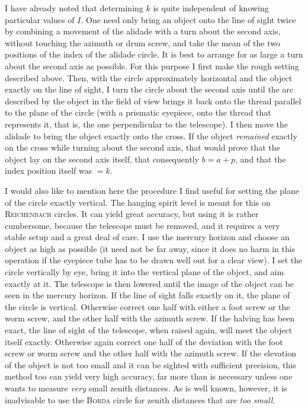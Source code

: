 \par\indent I have already noted that determining $k$ is quite independent of knowing particular values of $I$. One need only bring an object onto the line of sight twice by combining a movement of the alidade with a turn about the second axis, without touching the azimuth or drum screw, and take the mean of the two positions of the index of the alidade circle. It is best to arrange for as large a turn about the second axis as possible. For this purpose I first make the rough setting described above. Then, with the circle approximately horizontal and the object exactly on the line of sight, I turn the circle about the second axis until the arc described by the object in the field of view brings it back onto the thread parallel to the plane of the circle (with a prismatic eyepiece, onto the thread that represents it, that is, the one perpendicular to the telescope). I then move the alidade to bring the object exactly onto the cross. If the object \emph{remained} exactly on the cross while turning about the second axis, that would prove that the object lay on the second axis itself, that consequently $b=a+p$, and that the index position itself was $=k$.

\par\indent I would also like to mention here the procedure I find useful for setting the plane of the circle exactly vertical. The hanging spirit level is meant for this on \textsc{Reichenbach} circles. It can yield great accuracy, but using it is rather cumbersome, because the telescope must be removed, and it requires a very stable setup and a great deal of care. I use the mercury horizon and choose an object as high as possible (it need not be far away, since it does no harm in this operation if the eyepiece tube has to be drawn well out for a clear view). I set the circle vertically by eye, bring it into the vertical plane of the object, and aim exactly at it. The telescope is then lowered until the image of the object can be seen in the mercury horizon. If the line of sight falls exactly on it, the plane of the circle is vertical. Otherwise correct one half with either a foot screw or the worm screw, and the other half with the azimuth screw. If the halving has been exact, the line of sight of the telescope, when raised again, will meet the object itself exactly. Otherwise again correct one half of the deviation with the foot screw or worm screw and the other half with the azimuth screw. If the elevation of the object is not too small and it can be sighted with sufficient precision, this method too can yield very high accuracy, far more than is necessary unless one wants to measure \emph{very} small zenith distances. As is well known, however, it is inadvisable to use the \textsc{Borda} circle for zenith distances that are \emph{too small}.

